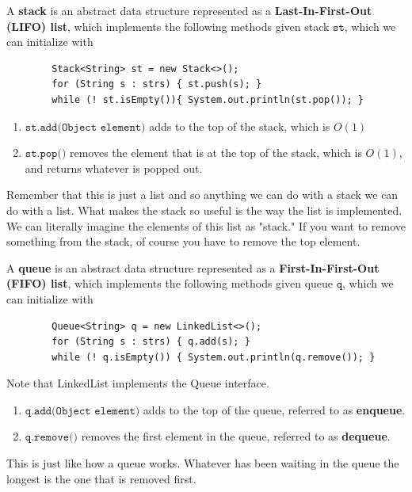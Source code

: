 \documentclass{article}
\begin{document}
    \begin{definition}[Stacks]
    A \textbf{stack} is an abstract data structure represented as a \textbf{Last-In-First-Out (LIFO) list}, which implements the following methods given stack $\texttt{st}$, which we can initialize with 
    \begin{lstlisting}
        Stack<String> st = new Stack<>(); 
        for (String s : strs) { st.push(s); }
        while (! st.isEmpty()){ System.out.println(st.pop()); }
    \end{lstlisting}
    \begin{enumerate}
        \item $\texttt{st.add(Object element)}$ adds to the top of the stack, which is $O(1)$ 
        \item $\texttt{st.pop()}$ removes the element that is at the top of the stack, which is $O(1)$, and returns whatever is popped out. 
    \end{enumerate}
    Remember that this is just a list and so anything we can do with a stack we can do with a list. What makes the stack so useful is the way the list is implemented. We can literally imagine the elements of this list as "stack." If you want to remove something from the stack, of course you have to remove the top element. 
    \end{definition}

    \begin{definition}[Queue]
    A \textbf{queue} is an abstract data structure represented as a \textbf{First-In-First-Out (FIFO) list}, which implements the following methods given queue $\texttt{q}$, which we can initialize with 
    \begin{lstlisting}
        Queue<String> q = new LinkedList<>(); 
        for (String s : strs) { q.add(s); }
        while (! q.isEmpty()) { System.out.println(q.remove()); }
    \end{lstlisting}
    Note that LinkedList implements the Queue interface. 
    \begin{enumerate}
        \item $\texttt{q.add(Object element)}$ adds to the top of the queue, referred to as \textbf{enqueue}. 
        \item $\texttt{q.remove()}$ removes the first element in the queue, referred to as \textbf{dequeue}. 
    \end{enumerate}
    This is just like how a queue works. Whatever has been waiting in the queue the longest is the one that is removed first. 
    \end{definition}
\end{document}
